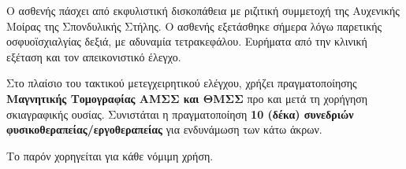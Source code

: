 \documentclass[10pt,greek]{article}
\begin{document}
\begin{PatientInfo}
\end{PatientInfo}

Ο ασθενής πάσχει από εκφυλιστική δισκοπάθεια με ριζιτική συμμετοχή της Αυχενικής Μοίρας της Σπονδυλικής Στήλης.
Ο ασθενής εξετάσθηκε σήμερα λόγω παρετικής οσφυοϊσχιαλγίας δεξιά, με αδυναμία τετρακεφάλου.
Ευρήματα από την κλινική εξέταση και τον απεικονιστικό έλεγχο.

Στο πλαίσιο του τακτικού μετεγχειρητικού ελέγχου, χρήζει πραγματοποίησης \textbf{Μαγνητικής Τομογραφίας ΑΜΣΣ και ΘΜΣΣ} προ και μετά τη χορήγηση σκιαγραφικής ουσίας.
Συνιστάται η πραγματοποίηση \textbf{10 (δέκα) συνεδριών φυσικοθεραπείας/εργοθεραπείας} για ενδυνάμωση των κάτω άκρων.

Το παρόν χορηγείται για κάθε νόμιμη χρήση.
\end{document}
